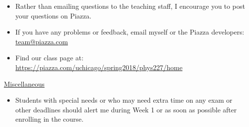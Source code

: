 \begin{itemize}

  \item Rather than emailing questions to the teaching staff, I encourage you to post your questions on Piazza. 

  \item If you have any problems or feedback, email myself or the Piazza developers: \href{mailto:team@piazza.com}{team@piazza.com}

  \item Find our class page at: \href{https://piazza.com/uchicago/spring2018/phys227/home}{https://piazza.com/uchicago/spring2018/phys227/home}
  
\end{itemize}  


\noindent \underline{Miscellaneous}

\begin{itemize}

  \item Students with special needs or who may need extra time on any exam or other deadlines should alert me during Week 1 or as soon as possible after enrolling in the course.
  
\end{itemize}  

